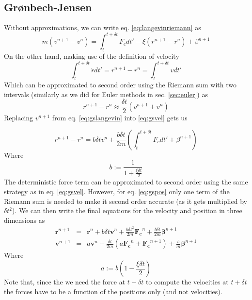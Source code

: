 \documentclass[ twoside,openright,titlepage,numbers=noenddot,%
headinclude,footinclude,cleardoublepage=empty,abstract=on,
BCOR=5mm,paper=a4,fontsize=11pt, dvipsnames
]{scrreprt}
\renewcommand{\vec}[1]{\bm{#1}}
\newcommand{\dt}{\delta t}
\begin{document}
\subsection{Grønbech-Jensen}\label{sec:gronbechjensen}
Without approximations, we can write eq. \eqref{eq:langevinriemann} as
\begin{equation}
  \label{eq:gslangevin}
  m\left(v^{n+1}-v^n\right) = \int_t^{t+\dt}F_c dt' - \xi\left(r^{n+1}-r^n\right) + \beta^{n+1}
\end{equation}
On the other hand, making use of the definition of velocity
\begin{equation}
  \int_t^{t+\dt}\dot{r}dt' = r^{n+1} - r^n = \int_t^{t+\dt}vdt'
\end{equation}
Which can be approximated to second order using the Riemann sum with two intervals (similarly as we did for Euler methods in sec. \ref{sec:euler}) as
\begin{equation}
  \label{eq:gsvel}
  r^{n+1} - r^n \approx \frac{\dt}{2}\left(v^{n+1}+v^n\right)
\end{equation}
Replacing $v^{n+1}$ from eq. \eqref{eq:gslangevin} into \eqref{eq:gsvel} gets us

\begin{equation}
  \label{eq:gspos}
  r^{n+1} - r^n =  b \dt v^n + \frac{b\dt}{2m}\left(\int_t^{t+\dt}F_cdt' + \beta^{n+1}\right)
\end{equation}
Where
\begin{equation}
b := \frac{1}{1+\frac{\xi\dt}{2}}
\end{equation}
The deterministic force term can be approximated to second order using the same strategy as in eq. \eqref{eq:gsvel}. However, for eq. \eqref{eq:gspos} only one term of the Riemann sum is needed to make it second order accurate (as it gets multiplied by $\dt^2$). We can then write the final equations for the velocity and position in three dimensions as
\begin{eqnarray}
  \label{eq:gsfinal}
  \vec{r}^{n+1}  &=&  \vec{r}^n + b \dt \vec{v}^n + \frac{b\dt^2}{2m}\vec{F_c}^n + \frac{b\dt}{2m}\vec{\beta}^{n+1}\\
  \vec{v}^{n+1} &=& a\vec{v}^n + \frac{\dt}{2m}\left(a\vec{F_c}^n + \vec{F_c} ^{n+1}\right) +  \frac{b}{m}\vec{\beta}^{n+1}
\end{eqnarray}
Where
\begin{equation}
  a:=b \left(1-\frac{\xi\dt}{2}\right)
\end{equation}
Note that, since the we need the force at $t+\dt$ to compute the velocities at $t+\dt$ the forces have to be a function of the positions only (and not velocities).
\end{document}
